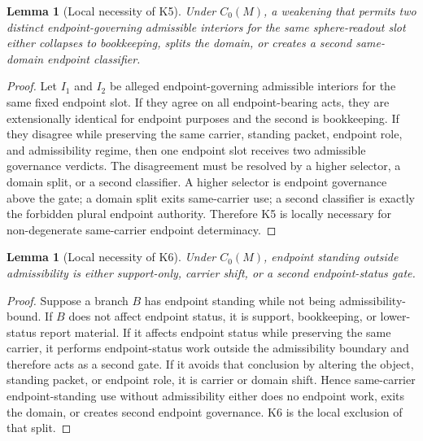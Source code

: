 \documentclass[11pt]{article}
\newtheorem{lemma}[theorem]{Lemma}
\begin{document}
\begin{lemma}[Local necessity of K5]\label{lem:k5-local-necessity}
Under \(C_0(M)\), a weakening that permits two distinct endpoint-governing admissible interiors for the same sphere-readout slot either collapses to bookkeeping, splits the domain, or creates a second same-domain endpoint classifier.
\end{lemma}
\begin{proof}
Let \(I_1\) and \(I_2\) be alleged endpoint-governing admissible interiors for the same fixed endpoint slot.  If they agree on all endpoint-bearing acts, they are extensionally identical for endpoint purposes and the second is bookkeeping.  If they disagree while preserving the same carrier, standing packet, endpoint role, and admissibility regime, then one endpoint slot receives two admissible governance verdicts.  The disagreement must be resolved by a higher selector, a domain split, or a second classifier.  A higher selector is endpoint governance above the gate; a domain split exits same-carrier use; a second classifier is exactly the forbidden plural endpoint authority.  Therefore K5 is locally necessary for non-degenerate same-carrier endpoint determinacy.
\end{proof}

\begin{lemma}[Local necessity of K6]\label{lem:k6-local-necessity}
Under \(C_0(M)\), endpoint standing outside admissibility is either support-only, carrier shift, or a second endpoint-status gate.
\end{lemma}
\begin{proof}
Suppose a branch \(B\) has endpoint standing while not being admissibility-bound.  If \(B\) does not affect endpoint status, it is support, bookkeeping, or lower-status report material.  If it affects endpoint status while preserving the same carrier, it performs endpoint-status work outside the admissibility boundary and therefore acts as a second gate.  If it avoids that conclusion by altering the object, standing packet, or endpoint role, it is carrier or domain shift.  Hence same-carrier endpoint-standing use without admissibility either does no endpoint work, exits the domain, or creates second endpoint governance.  K6 is the local exclusion of that split.
\end{proof}
\end{document}
